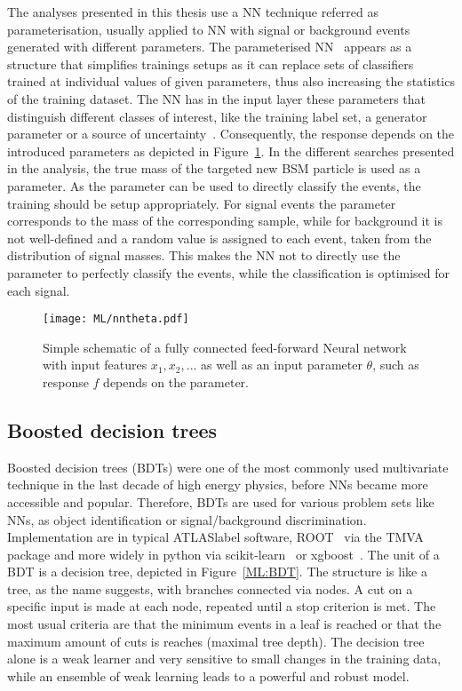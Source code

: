 The analyses presented in this thesis use a NN technique referred as parameterisation, usually applied to NN with signal or background events generated with different parameters. The parameterised NN~\cite{Baldi_2016} appears as a structure that simplifies trainings setups as it can replace sets of classifiers trained at individual values of given parameters, thus also increasing the statistics of the training dataset. The NN has in the input layer these parameters that distinguish different classes of interest, like the training label set, a generator parameter or a source of uncertainty~\cite{Ghosh_2021}. Consequently, the response depends on the introduced parameters as depicted in Figure~\ref{ML:PNN}. In the different searches presented in the analysis, the true mass of the targeted new BSM particle is used as a parameter. As the parameter can be used to directly classify the events, the training should be setup appropriately. For signal events the parameter corresponds to the mass of the corresponding sample, while for background it is not well-defined and a random value is assigned to each event, taken from the distribution of signal masses. This makes the NN not to directly use the parameter to perfectly classify the events, while the classification is optimised for each signal.

\begin{figure}[htbp]
    \RawFloats
    \begin{center}
    \texttt{[image: ML/nntheta.pdf]}
    \caption{
        Simple schematic of a fully connected feed-forward Neural network with input features $x_1, x_2,...$ as well as an input parameter $\theta$, such as response $f$ depends on the parameter.
    }
    \label{ML:PNN}
    \end{center}
\end{figure}

\subsection{Boosted decision trees}

Boosted decision trees (BDTs) were one of the most commonly used multivariate technique in the last decade of high energy physics, before NNs became more accessible and popular. Therefore, BDTs are used for various problem sets like NNs, as object identification or signal/background discrimination. Implementation are in typical \acrshort{ATLASlabel} software, ROOT~\cite{BRUN199781} via the TMVA~\cite{TMVA} package and more widely in python via scikit-learn~\cite{scikit-learn} or xgboost~\cite{Chen_2016}. The unit of a BDT is a decision tree, depicted in Figure~\ref{ML:BDT}. The structure is like a tree, as the name suggests, with branches connected via nodes. A cut on a specific input is made at each node, repeated until a stop criterion is met. The most usual criteria are that the minimum events in a leaf is reached or that the maximum amount of cuts is reaches (maximal tree depth). The decision tree alone is a weak learner and very sensitive to small changes in the training data, while an ensemble of weak learning leads to a powerful and robust model.
 

